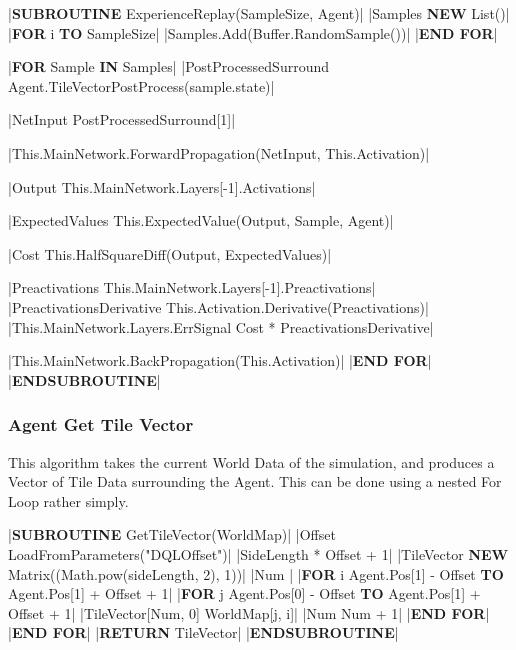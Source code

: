 \begin{flushleft}
                \vspace{0.2cm}
                \begin{pseudocode}
|\textbf{SUBROUTINE} ExperienceReplay(SampleSize, Agent)|
    |Samples \leftarrow \textbf{NEW} List()|
    |\textbf{FOR} i  \textbf{TO} SampleSize|
        |Samples.Add(Buffer.RandomSample())|
    |\textbf{END FOR}|

    |\textbf{FOR} Sample \textbf{IN} Samples|
        |PostProcessedSurround \leftarrow Agent.TileVectorPostProcess(sample.state)|

        |NetInput \leftarrow PostProcessedSurround[1]|

        |This.MainNetwork.ForwardPropagation(NetInput, This.Activation)|

        |Output \leftarrow This.MainNetwork.Layers[-1].Activations|

        |ExpectedValues \leftarrow This.ExpectedValue(Output, Sample, Agent)|

        |Cost \leftarrow This.HalfSquareDiff(Output, ExpectedValues)|

        |Preactivations \leftarrow This.MainNetwork.Layers[-1].Preactivations|
        |PreactivationsDerivative \leftarrow This.Activation.Derivative(Preactivations)|
        |This.MainNetwork.Layers.ErrSignal \leftarrow Cost * PreactivationsDerivative|

        |This.MainNetwork.BackPropagation(This.Activation)|
    |\textbf{END FOR}|
|\textbf{ENDSUBROUTINE}|
                \end{pseudocode}

                \vspace{0.5cm}
            \subsubsection{Agent Get Tile Vector}
                This algorithm takes the current World Data of the simulation, and produces a Vector of Tile Data surrounding the Agent. This can
                be done using a nested For Loop rather simply.

                \vspace{0.2cm}
                \begin{pseudocode}
|\textbf{SUBROUTINE} GetTileVector(WorldMap)|
    |Offset \leftarrow LoadFromParameters("DQLOffset")|
    |SideLength  * Offset + 1|
    |TileVector \leftarrow \textbf{NEW} Matrix((Math.pow(sideLength, 2), 1))|
    |Num |
    |\textbf{FOR} i \leftarrow Agent.Pos[1] - Offset \textbf{TO} Agent.Pos[1] + Offset + 1|
        |\textbf{FOR} j \leftarrow Agent.Pos[0] - Offset \textbf{TO} Agent.Pos[1] + Offset + 1|
            |TileVector[Num, 0] \leftarrow WorldMap[j, i]|
            |Num \leftarrow Num + 1|
        |\textbf{END FOR}|
    |\textbf{END FOR}|
    |\textbf{RETURN} TileVector|
|\textbf{ENDSUBROUTINE}|
                \end{pseudocode}
                

\end{flushleft}

